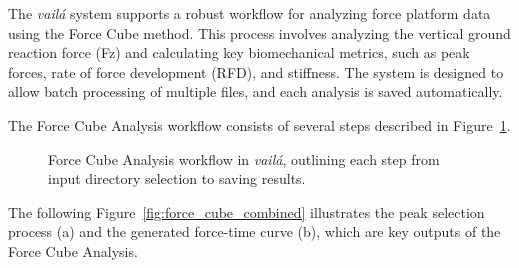 \documentclass{article}
\begin{document}
The \textit{vailá} system supports a robust workflow for analyzing force platform data using the Force Cube method. This process involves analyzing the vertical ground reaction force (Fz) and calculating key biomechanical metrics, such as peak forces, rate of force development (RFD), and stiffness. The system is designed to allow batch processing of multiple files, and each analysis is saved automatically.

The Force Cube Analysis workflow consists of several steps described in Figure~\ref{fig:force_cube_workflow}.

\begin{figure}[H]
    \centering
    \caption{Force Cube Analysis workflow in \textit{vailá}, outlining each step from input directory selection to saving results.}
    \label{fig:force_cube_workflow}
\end{figure}

The following Figure~\ref{fig:force_cube_combined} illustrates the peak selection process (a) and the generated force-time curve (b), which are key outputs of the Force Cube Analysis.
\end{document}
